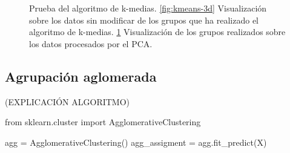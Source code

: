 \begin{figure}[h]
\begin{subfigure}{0.45\textwidth}
    \caption{}
    \label{fig:kmeans-pca}
  \end{subfigure}
  \caption[Prueba del algoritmo de k-medias.]{Prueba del algoritmo de k-medias. \ref{fig:kmeans-3d} Visualización sobre los datos sin modificar de los grupos que ha realizado el algoritmo de k-medias. \ref{fig:kmeans-pca} Visualización de los grupos realizados sobre los datos procesados por el PCA.}
  \label{fig:kmeans}
\end{figure}

\newpage
\subsection{Agrupación aglomerada}
(EXPLICACIÓN ALGORITMO)

\begin{mypython}[float={h},caption={Agrupación aglomerada.}]
  from sklearn.cluster import AgglomerativeClustering

  agg = AgglomerativeClustering()
  agg_assigment = agg.fit_predict(X)
\end{mypython}

